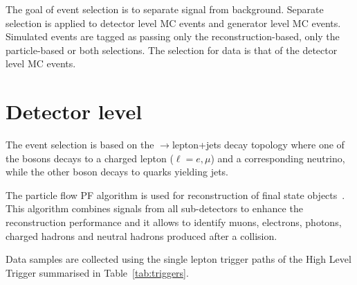 The goal of event selection is to separate signal from background. Separate selection is applied to detector level MC events and generator level MC events. Simulated events are tagged as passing only the reconstruction-based, only the particle-based or both selections. The selection for data is that of the detector level MC events.

\section{Detector level}
\label{sec:detector_level}

The event selection is based on the \ttbar$\to$lepton+jets decay topology where one of the \PW bosons decays to a charged lepton ($\ell=e, \mu$) and a corresponding neutrino, while the other \PW boson decays to quarks yielding jets.

The particle flow PF algorithm is used for reconstruction of final state objects~\cite{Sirunyan:2017ulk}. This algorithm combines signals from all sub-detectors to enhance the reconstruction performance and it allows to identify muons, electrons, photons, charged hadrons
and neutral hadrons produced after a \Pp\Pp collision.

Data samples are collected using the single lepton trigger paths of the High Level Trigger summarised in Table~\ref{tab:triggers}.

